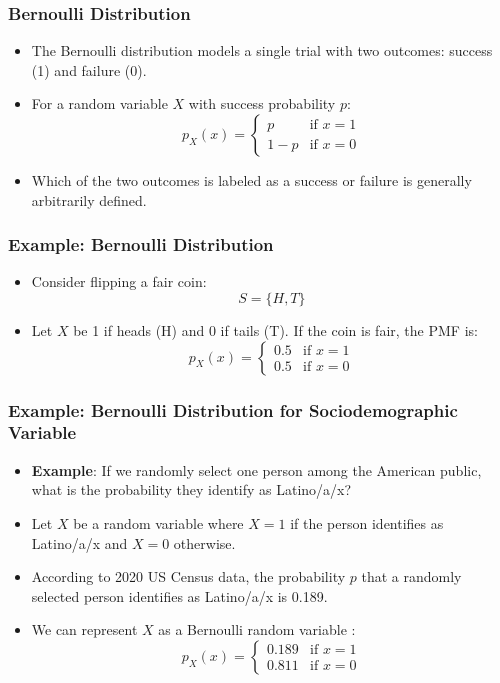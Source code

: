 \documentclass[handout]{beamer} %
\begin{document}
\begin{frame}
\frametitle{Bernoulli Distribution}
    \begin{itemize}
        \item The Bernoulli distribution models a single trial with two outcomes: success (1) and failure (0). \pause
        \item For a random variable \( X \) with success probability \( p \): \pause
        \[
        p_X(x) = \begin{cases} 
        p & \text{if } x = 1 \\
        1 - p & \text{if } x = 0
        \end{cases}
        \] \pause
        \item Which of the two outcomes is labeled as a success or failure is generally arbitrarily defined.
    \end{itemize}
\end{frame}

\begin{frame}
\frametitle{Example: Bernoulli Distribution}
    \begin{itemize}
        \item Consider flipping a fair coin: \pause
        \[
        S = \{H, T\}
        \] \pause
        \item Let \( X \) be 1 if heads (H) and 0 if tails (T). If the coin is fair, the PMF is: \pause
        \[
        p_X(x) = \begin{cases} 
        0.5 & \text{if } x = 1 \\
        0.5 & \text{if } x = 0
        \end{cases}
        \]
    \end{itemize}
\end{frame}


\begin{frame}
\frametitle{Example: Bernoulli Distribution for Sociodemographic Variable}
    \begin{itemize}
        \item \textbf{Example}: If we randomly select one person among the American public, what is the probability they identify as Latino/a/x? \pause
        \item Let \( X \) be a random variable where \( X = 1 \) if the person identifies as Latino/a/x and \( X = 0 \) otherwise. \pause
        \item According to 2020 US Census data, the probability \( p \) that a randomly selected person identifies as Latino/a/x is 0.189. \pause
        \item We can represent $X$ as a Bernoulli random variable : \pause
        \[
        p_X(x) = \begin{cases} 
        0.189 & \text{if } x = 1 \\
        0.811 & \text{if } x = 0
        \end{cases}
        \] \pause
    \end{itemize}
\end{frame}
\end{document}
